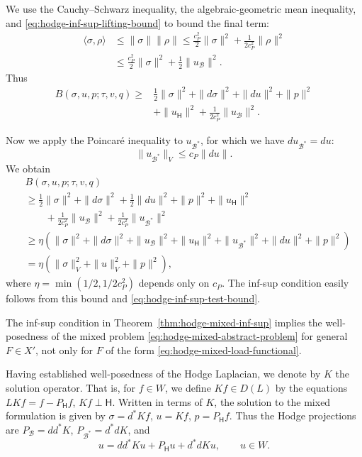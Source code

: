 \begin{Proof}
{We use the Cauchy–Schwarz inequality, the algebraic-geometric mean inequality, and \eqref{eq:hodge-inf-sup-lifting-bound} to bound the final term:}
\[
\begin{aligned}
\langle\sigma,\rho\rangle&\leq\|\sigma\|\|\rho\|\leq\frac{c_P^2}{2}\|\sigma\|^2+\frac{1}{2c_P^2}\|\rho\|^2\\
&\leq\frac{c_P^2}{2}\|\sigma\|^2+\frac12\|u_{\mathcal B}\|^2.
\end{aligned}
\]
{Thus}
\[
\begin{aligned}
B(\sigma,u,p;\tau,v,q)\geq{}&\frac12\|\sigma\|^2+\|d\sigma\|^2+\|du\|^2+\|p\|^2\\
&+\|u_{\mathsf H}\|^2+\frac{1}{2c_P^2}\|u_{\mathcal B}\|^2.
\end{aligned}
\]

{Now we apply the Poincaré inequality to $u_{\mathcal B^*}$, for which we have $du_{\mathcal B^*}=du$:}
\[
\|u_{\mathcal B^*}\|_V\leq c_P\|du\|.
\]
{We obtain}
\[
\begin{aligned}
&B(\sigma,u,p;\tau,v,q)\\
&\geq\frac12\|\sigma\|^2+\|d\sigma\|^2+\frac12\|du\|^2+\|p\|^2+\|u_{\mathsf H}\|^2\\
&\qquad+\frac{1}{2c_P^2}\|u_{\mathcal B}\|^2+\frac{1}{2c_P^2}\|u_{\mathcal B^*}\|^2\\
&\geq\eta(\|\sigma\|^2+\|d\sigma\|^2+\|u_{\mathcal B}\|^2+\|u_{\mathsf H}\|^2+\|u_{\mathcal B^*}\|^2+\|du\|^2+\|p\|^2)\\
&=\eta(\|\sigma\|_V^2+\|u\|_V^2+\|p\|^2),
\end{aligned}
\]
{where $\eta=\min(1/2,1/2c_P^2)$ depends only on $c_P$. The inf-sup condition easily follows from this bound and \eqref{eq:hodge-inf-sup-test-bound}.}
\end{Proof}

\begin{Remark}\label{rem:hodge-general-mixed-load}
{The inf-sup condition in Theorem~\ref{thm:hodge-mixed-inf-sup} implies the well-posedness of the mixed problem \eqref{eq:hodge-mixed-abstract-problem} for general $F\in X'$, not only for $F$ of the form \eqref{eq:hodge-mixed-load-functional}.}
\end{Remark}

{Having established well-posedness of the Hodge Laplacian, we denote by $K$ the solution operator. That is, for $f\in W$, we define $Kf\in D(L)$ by the equations $LKf=f-P_{\mathsf H}f$, $Kf\perp\mathsf H$. Written in terms of $K$, the solution to the mixed formulation is given by $\sigma=d^*Kf$, $u=Kf$, $p=P_{\mathsf H}f$. Thus the Hodge projections are $P_{\mathcal B}=dd^*K$, $P_{\mathcal B^*}=d^*dK$, and}
\[
u=dd^*Ku+P_{\mathsf H}u+d^*dKu,\qquad u\in W.
\]

